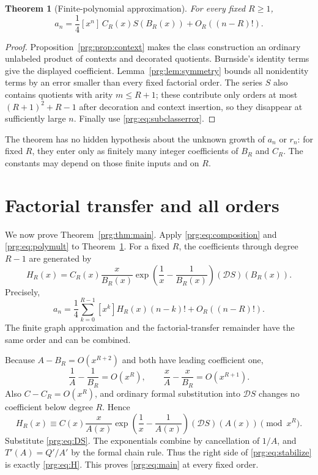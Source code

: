 \documentclass[11pt,letterpaper]{article}
\numberwithin{equation}{section}
\newtheorem{theorem}{Theorem}[section]
\theoremstyle{definition}\newtheorem{definition}[theorem]{Definition}
\theoremstyle{remark}\newtheorem{remark}[theorem]{Remark}
\begin{document}
\begin{theorem}[Finite-polynomial approximation]\label{prg:thm:finite}
For every fixed $R\geq1$,
\begin{equation}\label{prg:eq:finite}
 a_n=\frac14[x^n]\,C_R(x)S(B_R(x))+O_R((n-R)!).
\end{equation}
\end{theorem}
\begin{proof}
Proposition~\ref{prg:prop:context} makes the class construction an
ordinary unlabeled product of contexts and decorated quotients.
Burnside's identity terms give the displayed coefficient.
Lemma~\ref{prg:lem:symmetry} bounds all nonidentity terms by an error
smaller than every fixed factorial order. The series $S$ also
contains quotients with arity $m\leq R+1$; these contribute only
orders at most $(R+1)^2+R-1$ after decoration and context insertion,
so they disappear at sufficiently large $n$. Finally use
\eqref{prg:eq:subclasserror}.
\end{proof}

The theorem has no hidden hypothesis about the unknown growth of
$a_n$ or $r_n$: for fixed $R$, they enter only as finitely many
integer coefficients of $B_R$ and $C_R$. The constants may depend
on those finite inputs and on $R$.

\section{Factorial transfer and all orders}\label{prg:sec:transfer}

We now prove Theorem~\ref{prg:thm:main}. Apply
\eqref{prg:eq:composition} and \eqref{prg:eq:polymult} to
Theorem~\ref{prg:thm:finite}. For a fixed $R$, the coefficients through
degree $R-1$ are generated by
\begin{equation}\label{prg:eq:HR}
 H_R(x)=C_R(x)\frac{x}{B_R(x)}
       \exp\left(\frac1x-\frac1{B_R(x)}\right)
       (\mathcal D S)(B_R(x)).
\end{equation}
Precisely,
\[
 a_n=\frac14\sum_{k=0}^{R-1}[x^k]H_R(x)(n-k)!
             +O_R((n-R)!).
\]
The finite graph approximation and the factorial-transfer remainder
have the same order and can be combined.

Because $A-B_R=O(x^{R+2})$ and both have leading coefficient one,
\[
 \frac1A-\frac1{B_R}=O(x^R),\qquad
 \frac{x}{A}-\frac{x}{B_R}=O(x^{R+1}).
\]
Also $C-C_R=O(x^R)$, and ordinary formal substitution into
$\mathcal D S$ changes no coefficient below degree $R$. Hence
\begin{equation}\label{prg:eq:stabilize}
 H_R(x)\equiv C(x)\frac{x}{A(x)}
       \exp\left(\frac1x-\frac1{A(x)}\right)
       (\mathcal D S)(A(x))\pmod{x^R}.
\end{equation}
Substitute \eqref{prg:eq:DS}. The exponentials combine by cancellation
of $1/A$, and $T'(A)=Q'/A'$ by the formal chain rule. Thus the
right side of \eqref{prg:eq:stabilize} is exactly \eqref{prg:eq:H}.
This proves \eqref{prg:eq:main} at every fixed order.
\end{document}
